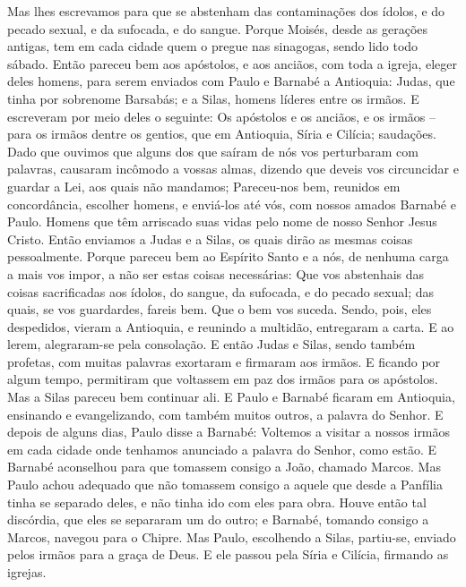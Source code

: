 {Mas
{} lhes escrevamos para que se abstenham das contaminações dos ídolos, e do pecado sexual, e da
{} sufocada, e do sangue.
Porque Moisés, desde as gerações antigas, tem em cada cidade quem o pregue nas sinagogas, sendo lido todo sábado.
Então pareceu bem aos apóstolos, e aos anciãos, com toda a igreja, eleger deles
{} homens, para serem enviados com Paulo e Barnabé a Antioquia: Judas, que tinha por sobrenome Barsabás; e a Silas, homens líderes entre os irmãos.
E escreveram por meio deles o seguinte: Os apóstolos e os anciãos, e os irmãos – para os irmãos dentre os gentios, que
{} em Antioquia, Síria e Cilícia; saudações.
Dado que ouvimos que alguns dos que saíram de nós vos perturbaram com palavras,
{} causaram incômodo a vossas almas, dizendo que deveis vos circuncidar e guardar a Lei, aos quais não mandamos;
Pareceu-nos bem, reunidos em concordância, escolher
{} homens, e enviá-los até vós, com nossos amados Barnabé e Paulo.
Homens que têm arriscado suas vidas pelo nome de nosso Senhor Jesus Cristo.
Então enviamos a Judas e a Silas, os quais
{} dirão as mesmas coisas pessoalmente.
Porque pareceu bem ao Espírito Santo e a nós, de nenhuma carga a mais vos impor, a não ser estas coisas necessárias:
Que vos abstenhais das coisas sacrificadas aos ídolos, do sangue, da
{} sufocada, e do pecado sexual; das quais, se vos guardardes, fareis bem. Que o bem vos suceda.
Sendo, pois, eles despedidos, vieram a Antioquia, e reunindo a multidão, entregaram a carta.
E ao lerem, alegraram-se pela consolação.
E então Judas e Silas, sendo também profetas, com muitas palavras exortaram e firmaram aos irmãos.
E ficando
{} por algum tempo, permitiram que voltassem em paz dos irmãos para os apóstolos.
Mas a Silas pareceu bem continuar ali.
E Paulo e Barnabé ficaram em Antioquia, ensinando e evangelizando, com também muitos outros, a palavra do Senhor.
E depois de alguns dias, Paulo disse a Barnabé: Voltemos a visitar a nossos irmãos em cada cidade onde tenhamos anunciado a palavra do Senhor,
{} como estão.
E Barnabé aconselhou para que tomassem consigo a João, chamado Marcos.
Mas Paulo achou adequado que não tomassem consigo a aquele que desde a Panfília tinha se separado deles, e não tinha ido com eles para
{} obra.
Houve então
{} tal discórdia, que eles se separaram um do outro; e Barnabé, tomando consigo a Marcos, navegou para o Chipre.
Mas Paulo, escolhendo a Silas, partiu-se, enviado pelos irmãos para a graça de Deus.
E ele passou pela Síria e Cilícia, firmando as igrejas.

}
